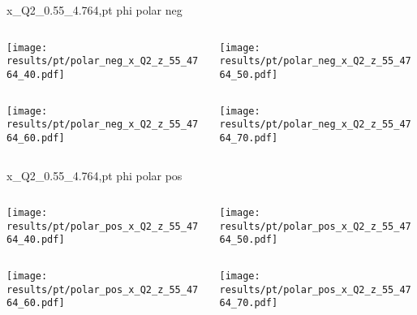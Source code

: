 \begin{frame}{x\_Q2\_0.55\_4.764,pt phi polar neg}
\begin{columns}
\begin{column}[T]{0.5\textwidth}
\texttt{[image: results/pt/polar\_neg\_x\_Q2\_z\_55\_4764\_40.pdf]}
\end{column}
\begin{column}[T]{0.5\textwidth}
\texttt{[image: results/pt/polar\_neg\_x\_Q2\_z\_55\_4764\_50.pdf]}
\end{column}
\end{columns}
\begin{columns}
\begin{column}[T]{0.5\textwidth}
\texttt{[image: results/pt/polar\_neg\_x\_Q2\_z\_55\_4764\_60.pdf]}
\end{column}
\begin{column}[T]{0.5\textwidth}
\texttt{[image: results/pt/polar\_neg\_x\_Q2\_z\_55\_4764\_70.pdf]}
\end{column}
\end{columns}
\end{frame}
\begin{frame}{x\_Q2\_0.55\_4.764,pt phi polar pos}
\begin{columns}
\begin{column}[T]{0.5\textwidth}
\texttt{[image: results/pt/polar\_pos\_x\_Q2\_z\_55\_4764\_40.pdf]}
\end{column}
\begin{column}[T]{0.5\textwidth}
\texttt{[image: results/pt/polar\_pos\_x\_Q2\_z\_55\_4764\_50.pdf]}
\end{column}
\end{columns}
\begin{columns}
\begin{column}[T]{0.5\textwidth}
\texttt{[image: results/pt/polar\_pos\_x\_Q2\_z\_55\_4764\_60.pdf]}
\end{column}
\begin{column}[T]{0.5\textwidth}
\texttt{[image: results/pt/polar\_pos\_x\_Q2\_z\_55\_4764\_70.pdf]}
\end{column}
\end{columns}
\end{frame}
